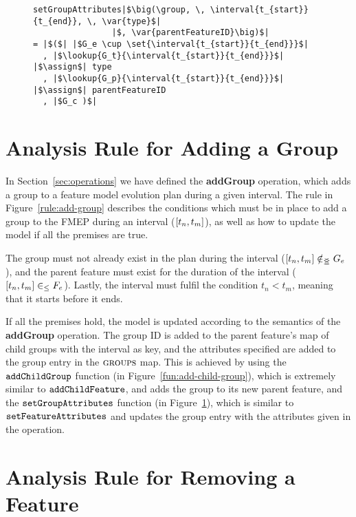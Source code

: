 \begin{figure}[hpbt]
  \begin{verbatim}
setGroupAttributes|$\big(\group, \, \interval{t_{start}}{t_{end}}, \, \var{type}$|
                |$, \var{parentFeatureID}\big)$|
= |$($| |$G_e \cup \set{\interval{t_{start}}{t_{end}}}$|
  , |$\lookup{G_t}{\interval{t_{start}}{t_{end}}}$| |$\assign$| type
  , |$\lookup{G_p}{\interval{t_{start}}{t_{end}}}$| |$\assign$| parentFeatureID
  , |$G_c )$|
  \end{verbatim}
  \caption{}
  \label{fun:set-group-attributes}
\end{figure}

\newpage
\section{Analysis Rule for Adding a Group}
\label{sec:add-group-rule}
In Section~\ref{sec:operations} we have defined the \textbf{addGroup} operation, which adds a group to a feature model evolution plan during a given interval. The rule in Figure~\ref{rule:add-group} describes the conditions which must be in place to add a group to the FMEP during an interval ($\interval{t_n}{t_m}$), as well as how to update the model if all the premises are true.

The group must not already exist in the plan during the interval ($\interval{t_n}{t_m} \notinnr G_e$), and the parent feature must exist for the duration of the interval ($\interval{t_n}{t_m} \inn F_e$). Lastly, the interval must fulfil the condition $t_n < t_m$, meaning that it starts before it ends. 

If all the premises hold, the model is updated according to the semantics of the \textbf{addGroup} operation. The group ID is added to the parent feature's map of child groups with the interval as key, and the attributes specified are added to the group entry in the $\textsc{groups}{}$ map. This is achieved by using the $\texttt{add\-Child\-Group}$ function (in Figure~\ref{fun:add-child-group}), which is extremely similar to $\texttt{add\-Child\-Feature}$, and adds the group to its new parent feature, and the $\texttt{set\-Group\-Attributes}$ function (in Figure~\ref{fun:set-group-attributes}), which is similar to $\texttt{set\-Feature\-Attributes}$ and updates the group entry with the attributes given in the operation.

\section{Analysis Rule for Removing a Feature}
\label{sec:remove-feature-rule}

